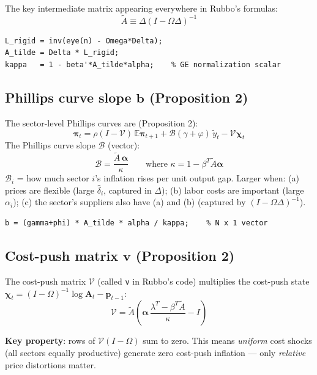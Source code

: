 \documentclass[11pt]{article}
\begin{document}
The key intermediate matrix appearing everywhere in Rubbo's formulas:
\[
  \widetilde{A} \equiv \Delta(I-\Omega\Delta)^{-1}
\]

\begin{lstlisting}[caption={Matlab: rigidity-adjusted Leontief and key intermediate}]
L_rigid = inv(eye(n) - Omega*Delta);
A_tilde = Delta * L_rigid;
kappa   = 1 - beta'*A_tilde*alpha;    % GE normalization scalar
\end{lstlisting}

\subsection{Phillips curve slope $\mathbf{b}$ (Proposition 2)}

The sector-level Phillips curves are (Proposition 2):
\[
  \boldsymbol\pi_t = \rho(I-\mathcal{V})\,\mathbb{E}\boldsymbol\pi_{t+1}
    + \mathcal{B}(\gamma+\varphi)\,\tilde{y}_t - \mathcal{V}\boldsymbol\chi_t
\]
The Phillips curve slope $\mathcal{B}$ (vector):
\[
  \mathcal{B} = \frac{\widetilde{A}\,\boldsymbol\alpha}{\kappa}
  \qquad \text{where }\kappa = 1 - \beta^T\widetilde{A}\boldsymbol\alpha
\]
$\mathcal{B}_i$ = how much sector $i$'s inflation rises per unit output gap.
Larger when: (a) prices are flexible (large $\hat\delta_i$, captured in $\Delta$);
(b) labor costs are important (large $\alpha_i$); (c) the sector's suppliers
also have (a) and (b) (captured by $(I-\Omega\Delta)^{-1}$).

\begin{lstlisting}[caption={Matlab: Phillips curve slope (matches parameters\_d.m)}]
b = (gamma+phi) * A_tilde * alpha / kappa;    % N x 1 vector
\end{lstlisting}

\subsection{Cost-push matrix $\mathbf{v}$ (Proposition 2)}

The cost-push matrix $\mathcal{V}$ (called \texttt{v} in Rubbo's code) multiplies
the cost-push state $\boldsymbol\chi_t = (I-\Omega)^{-1}\log\mathbf{A}_t - \mathbf{p}_{t-1}$:
\[
  \mathcal{V} = \widetilde{A}\!\left(\boldsymbol\alpha\,
    \frac{\lambda^T - \beta^T\widetilde{A}}{\kappa} - I\right)
\]

\textbf{Key property}: rows of $\mathcal{V}(I-\Omega)$ sum to zero.
This means \emph{uniform} cost shocks (all sectors equally productive) generate
zero cost-push inflation — only \emph{relative} price distortions matter.
\end{document}
